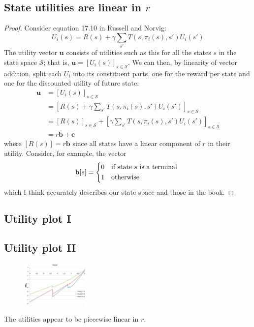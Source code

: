 \documentclass[letterpaper, 10pt]{article}
\begin{document}
\begin{multicols}{2}
\subsection{State utilities are linear in $r$}
\begin{proof}
Consider equation 17.10 in Russell and Norvig:
\[ U_i(s) = R(s) + \gamma \sum_{s'} T(s, \pi_i(s), s') U_i(s') \]
The utility vector $\mathbf{u}$ consists of utilities such as this for all the states $s$ in the state space $\mathcal{S}$; that is, $\mathbf{u} = [U_i(s)]_{s \in \mathcal{S}}$.
We can then, by linearity of vector addition, split each $U_i$ into its constituent parts, one for the reward per state and one for the discounted utility of future state:
\begin{align*}
\mathbf{u} &= [U_i(s)]_{s \in \mathcal{S}} \\
&= \left[ R(s) + \gamma \sum_{s'} T(s, \pi_i(s), s') U_i(s') \right]_{s \in \mathcal{S}} \\
&= [R(s)]_{s \in \mathcal{S}} + \left[ \gamma \sum_{s'} T(s, \pi_i(s), s') U_i(s') \right]_{s \in \mathcal{S}} \\
&= r\mathbf{b} + \mathbf{c}
\end{align*}
where $[R(s)] = r\mathbf{b}$ since all states have a linear component of $r$ in their utility. 
Consider, for example, the vector
\[
\mathbf{b}[s] = \begin{dcases*}
0 & if state $s$ is a terminal \\
1 & otherwise
\end{dcases*}
\]
which I think accurately describes our state space and those in the book.
\end{proof}

\subsection{Utility plot I}


\subsection{Utility plot II}
\begin{figure}[h]
	\centering
	\includegraphics[width=0.3\textwidth]{prob15}
	\caption{}
	\label{fig:prob15}
\end{figure}
The utilities appear to be piecewise linear in $r$.


\end{multicols}
\end{document}
